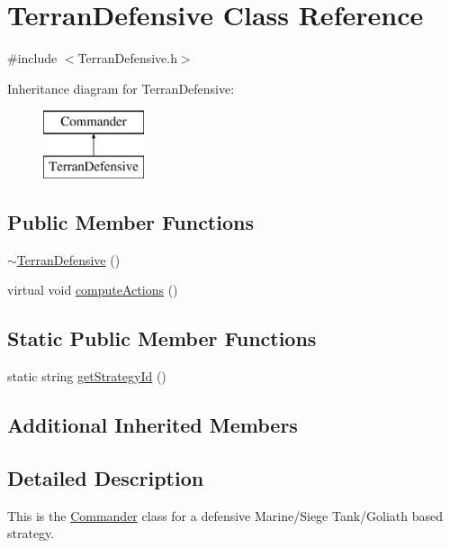 \hypertarget{class_terran_defensive}{\section{Terran\-Defensive Class Reference}
\label{class_terran_defensive}
}


{\ttfamily \#include $<$Terran\-Defensive.\-h$>$}

Inheritance diagram for Terran\-Defensive\-:\begin{figure}[H]
\begin{center}
\leavevmode
\includegraphics[height=2.000000cm]{class_terran_defensive}
\end{center}
\end{figure}
\subsection*{Public Member Functions}
\begin{DoxyCompactItemize}
\item 
\hyperlink{class_terran_defensive_a97dcada184ffd6314019059d198df382}{$\sim$\-Terran\-Defensive} ()
\item 
virtual void \hyperlink{class_terran_defensive_a16802114c6c1641483b9dc308a945c9f}{compute\-Actions} ()
\end{DoxyCompactItemize}
\subsection*{Static Public Member Functions}
\begin{DoxyCompactItemize}
\item 
static string \hyperlink{class_terran_defensive_af77b76b16f32ea910a08c23a76b6716f}{get\-Strategy\-Id} ()
\end{DoxyCompactItemize}
\subsection*{Additional Inherited Members}


\subsection{Detailed Description}
This is the \hyperlink{class_commander}{Commander} class for a defensive Marine/\-Siege Tank/\-Goliath based strategy.

